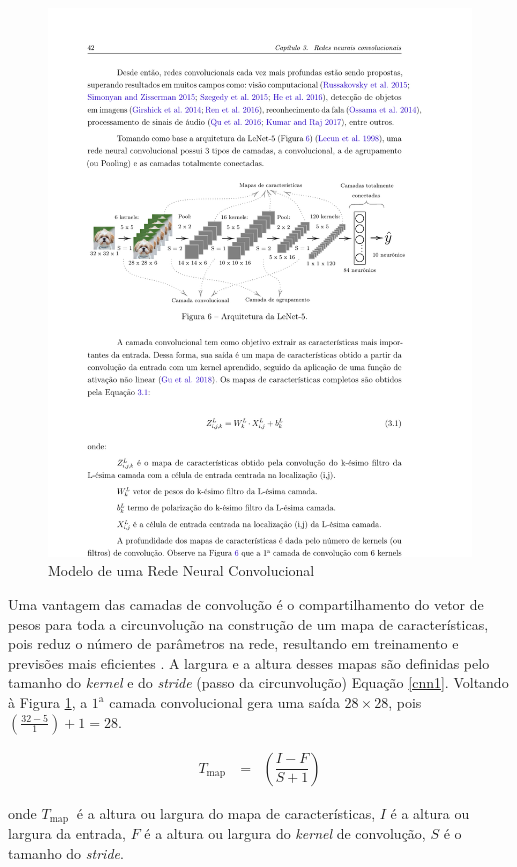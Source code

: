 \begin{figure}[H]
	\centering
	\caption{Modelo de uma Rede Neural Convolucional}
	\includegraphics[width=1\linewidth]{Apendices/Figuras/modelagem-24h/cnn}
	
	\label{fig:cnn}
\end{figure}


Uma vantagem das camadas de convolução é o compartilhamento do vetor de pesos para toda a circunvolução na construção de um mapa de características, pois reduz o número de parâmetros na rede, resultando em treinamento e previsões mais eficientes
\cite{lucas_2019}.
A largura e a altura desses mapas são definidas pelo tamanho do \textit{kernel} e do \textit{stride} (passo da circunvolução) Equação \eqref{cnn1}. Voltando à Figura \ref{fig:cnn}, a $1^{\mathrm{a}}$ camada convolucional gera uma saída $28 \times 28$, pois $\left(\frac{32-5}{1}\right)+1=28$.

\begin{eqnarray}
	T_{\text {map }}&=&\left(\dfrac{I-F}{S+1}\right)\label{cnn1}
\end{eqnarray}

\noindent onde
$T_{\text {map }}$ é a altura ou largura do mapa de características,
$I$ é a altura ou largura da entrada,
$F$ é a altura ou largura do \textit{kernel} de convolução,
$S$ é o tamanho do \textit{stride}.
